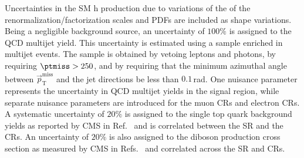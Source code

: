 Uncertainties in the SM h production due to variations of the of the renormalization/factorization scales and PDFs are included as shape variations. Being a negligible background source, an uncertainty of $100\%$ is assigned to the QCD multijet yield. This uncertainty is estimated using a sample enriched in multijet events. The sample is obtained by vetoing leptons and photons, by requiring $\ptmiss>250$\GeV, and by requiring that the minimum azimuthal angle between $\vec{p}_{\mathrm{T}}^{\mathrm{miss}}$ and the jet directions be less than $0.1$\,rad. One nuisance parameter represents the uncertainty in QCD multijet yields in the signal region, while separate nuisance parameters are introduced for the muon CRs and electron CRs. A systematic uncertainty of $20\%$ is assigned to the single top quark background yields as reported by CMS in Ref.~\cite{Chatrchyan:1642680} and is correlated between the SR and the CRs. An uncertainty of $20\%$ is also assigned to the diboson production cross section as measured by CMS in Refs.~\cite{Khachatryan:2016txa,Khachatryan:2016tgp} and correlated across the SR and CRs.



